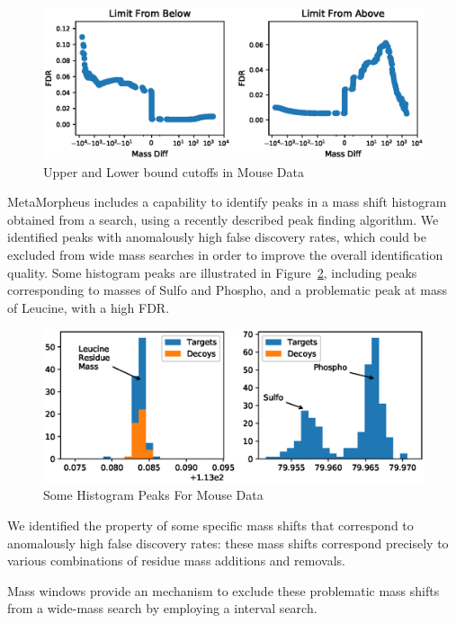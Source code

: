 \documentclass[journal=jprobs,manuscript=article]{achemso}
\begin{document}
\begin{figure}
\caption{Upper and Lower bound cutoffs in Mouse Data}
\label{fig:fig4-limitsOnOpenSearch}
\includegraphics{fig4-limitsOnOpenSearch}
\end{figure}

MetaMorpheus includes a capability to identify peaks in a mass shift histogram obtained from a search, using a recently described peak finding algorithm\cite{Rodriguez_2014}.
We identified peaks with anomalously high false discovery rates, which could be excluded from wide mass searches in order to improve the overall identification quality.
Some histogram peaks are illustrated in Figure~\ref{fig:fig5-HistogramsAround80and113}, including peaks corresponding to masses of Sulfo and Phospho, and a problematic peak at mass of Leucine, with a high FDR.

\begin{figure}
\caption{Some Histogram Peaks For Mouse Data}
\label{fig:fig5-HistogramsAround80and113}
\includegraphics{fig5-HistogramsAround80and113}
\end{figure}

We identified the property of some specific mass shifts that correspond to anomalously high false discovery rates: these mass shifts correspond precisely to various combinations of residue mass additions and removals.

Mass windows provide an mechanism to exclude these problematic mass shifts from a wide-mass search by employing a interval search.
\end{document}
